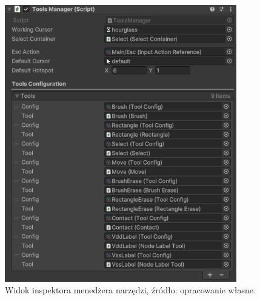 \begin{figure}[h!]
    \centering
    \includegraphics[width=0.9\textwidth]{chapters/chapter4/rys/tools_manager}
    \caption[Widok inspektora menedżera narzędzi.]{Widok inspektora menedżera narzędzi, źródło: opracowanie własne.}
    \label{fig:tools_manager}
\end{figure}

